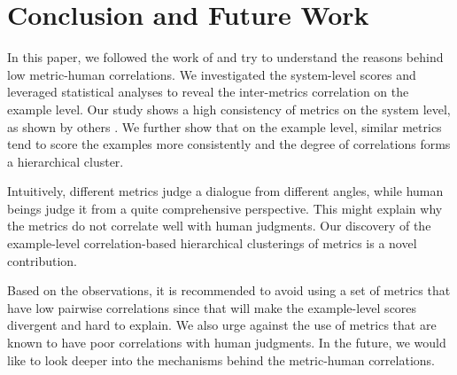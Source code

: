 \documentclass[runningheads]{llncs}
\begin{document}
    \section{Conclusion and Future Work}
    In this paper, we followed the work of \cite{HowNot} and try to understand the reasons behind low metric-human correlations. We investigated the system-level scores and leveraged statistical analyses to reveal the inter-metrics correlation on the example level. Our study shows a high consistency of metrics on the system level, as shown by others \cite{HowNot,VHRED,GoogleChatbot}. We further show that on the example level, similar metrics tend to score the examples more consistently and the degree of correlations forms a hierarchical cluster.

    Intuitively, different metrics judge a dialogue from different angles, while human beings judge it from a quite comprehensive perspective. This might explain why the metrics do not correlate well with human judgments. Our discovery of the example-level correlation-based hierarchical clusterings of metrics is a novel contribution.

    Based on the observations, it is recommended to avoid using a set of metrics that have low pairwise correlations since that will make the example-level scores divergent and hard to explain. We also urge against the use of metrics that are known to have poor correlations with human judgments. In the future, we would like to look deeper into the mechanisms behind the metric-human correlations.

    
    
\end{document}
